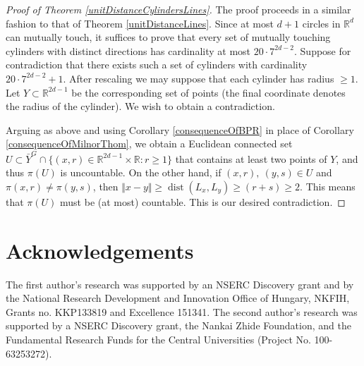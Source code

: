\documentclass[letterpaper, reqno, 11pt]{article}
\numberwithin{equation}{section}
\newcommand{\RR}{\mathbb{R}}
\theoremstyle{remark}
\begin{document}
\begin{proof}[Proof of Theorem \ref{unitDistanceCylindersLines}]
The proof proceeds in a similar fashion to that of Theorem \ref{unitDistanceLines}. Since at most $d+1$ circles in $\RR^d$ can mutually touch, it suffices to prove that every set of mutually touching cylinders with distinct directions has cardinality at most $20\cdot 7^{2d-2}$. Suppose for contradiction that there exists such a set of cylinders with cardinality $20\cdot 7^{2d-2}+1$. After rescaling we may suppose that each cylinder has radius $\geq 1$. Let $Y\subset\RR^{2d-1}$ be the corresponding set of points (the final coordinate denotes the radius of the cylinder). We wish to obtain a contradiction. 

Arguing as above and using Corollary \ref{consequenceOfBPR} in place of Corollary \ref{consequenceOfMilnorThom}, we obtain a Euclidean connected set $U\subset \bar Y^G \cap \{(x,r)\in\RR^{2d-1}\times\RR\colon r \geq 1\}$ that contains at least two points of $Y$, and thus $\pi(U)$ is uncountable. %
%
On the other hand, if $(x,r),\ (y,s)\in U$ and $\pi(x,r)\neq\pi(y,s)$, then $\Vert x-y\Vert \geq \operatorname{dist}(L_x, L_y) \geq (r+s)\geq 2$. This means that $\pi(U)$ must be (at most) countable. This is our desired contradiction.
\end{proof}

\section{Acknowledgements}
The first author's research was supported by an NSERC Discovery grant and by the National Research Development and Innovation Office
of Hungary, NKFIH, Grants no. KKP133819 and Excellence 151341. The second author's research was supported by a NSERC Discovery grant, the Nankai Zhide Foundation, and the Fundamental Research Funds for the Central Universities (Project No. 100-63253272).
\end{document}
